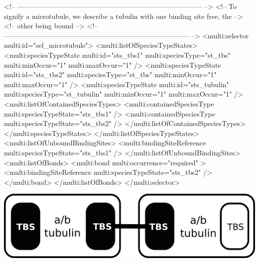 \begin{example}
<!-- -------------------------------------------------------------------------------- -->
<!-- To signify a microtubule, we describe a tubulin with one binding site free, the  -->
<!-- other being bound                                                                -->
<!-- -------------------------------------------------------------------------------- -->
      <multi:selector multi:id="sel_microtubule">
        <multi:listOfSpeciesTypeStates>
          <multi:speciesTypeState multi:id="sts_tbs1" multi:speciesType="st_tbs" 
                                   multi:minOccur="1" multi:maxOccur="1" />
          <multi:speciesTypeState multi:id="sts_tbs2" multi:speciesType="st_tbs" 
                                   multi:minOccur="1" multi:maxOccur="1" />
          <multi:speciesTypeState multi:id="sts_tubulin" multi:speciesType="st_tubulin" 
                                   multi:minOccur="1" multi:maxOccur="1" />
            <multi:listOfContainedSpeciesTypes>
              <multi:containedSpeciesType multi:speciesTypeState="sts_tbs1" /> 
              <multi:containedSpeciesType multi:speciesTypeState="sts_tbs2" />
            </multi:listOfContainedSpeciesTypes>
          </multi:speciesTypeStates>
        </multi:listOfSpeciesTypeStates>
        <multi:listOfUnboundBindingSites>
          <multi:bindingSiteReference multi:speciesTypeState="sts_tbs1" />
        </multi:listOfUnboundBindingSites>
        <multi:listOfBonds>
          <multi:bond multi:occurrence="required" >
            <multi:bindingSiteReference multi:speciesTypeState="sts_tbs2" />
          </multi:bond>
        </multi:listOfBonds>
      </multi:selector>

\end{example}

\includegraphics{figs/pngs/sel_microtubuleExtended.png}

